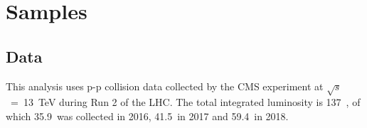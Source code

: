 
\section{Samples}
\subsection{Data}
This analysis uses p-p collision data collected by the CMS experiment at $\sqrt{s}$~=~13~TeV during Run 2 of the LHC. The total integrated luminosity is 137~\fbinv, of which 35.9~\fbinv was collected in 2016, 41.5~\fbinv in 2017 and 59.4~\fbinv in 2018.



